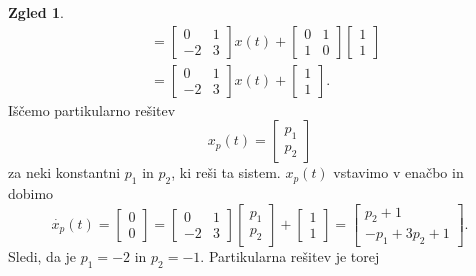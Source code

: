 \documentclass[12pt,a4paper]{amsart}
\theoremstyle{definition} %
\newtheorem{zgled}[definicija]{Zgled}
\theoremstyle{plain} %
\begin{document}
\begin{zgled}
\begin{equation*}
\begin{split}
            &= \begin{bmatrix}
                0 & 1 \\
                -2 & 3 
            \end{bmatrix}x(t)+\begin{bmatrix}
                0 & 1 \\
                1 & 0 
            \end{bmatrix}
            \begin{bmatrix}
                1  \\
                1  
            \end{bmatrix} \\
            &= \begin{bmatrix}
                0 & 1 \\
                -2 & 3 
            \end{bmatrix}x(t)+
            \begin{bmatrix}
                1  \\
                1  
            \end{bmatrix}.
        \end{split}
    \end{equation*}
    Iščemo partikularno rešitev 
    \[x_p(t)=\begin{bmatrix}
        p_1  \\
        p_2  
    \end{bmatrix}\]
    za neki konstantni $p_1$ in $p_2$, ki reši ta sistem. $x_p(t)$ vstavimo v enačbo in dobimo
    \[\dot{x_p}(t)=\begin{bmatrix}
        0  \\
        0  
    \end{bmatrix} = \begin{bmatrix}
        0 & 1 \\
        -2 & 3 
    \end{bmatrix}
    \begin{bmatrix}
        p_1  \\
        p_2  
    \end{bmatrix} +
    \begin{bmatrix}
        1  \\
        1  
    \end{bmatrix} = 
    \begin{bmatrix}
        p_2+1  \\
        -p_1+3p_2+1  
    \end{bmatrix}.\]
    Sledi, da je $p_1=-2$ in $p_2=-1$. Partikularna rešitev je torej

\end{zgled}
\end{document}
